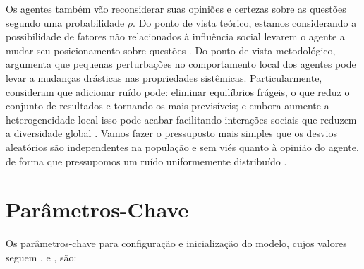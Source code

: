 Os agentes também vão reconsiderar suas opiniões e certezas sobre as questões
segundo uma probabilidade \(\rho\). Do ponto de vista teórico, estamos considerando
a possibilidade de fatores não relacionados à influência social levarem o agente
a mudar seu posicionamento sobre questões \cite{flache2017, lorenz2017modeling}.
Do ponto de vista metodológico,  argumenta que
pequenas perturbações no comportamento local dos agentes pode levar a mudanças
drásticas nas propriedades sistêmicas. Particularmente, consideram que adicionar
ruído pode: eliminar equilíbrios frágeis, o que reduz o conjunto de resultados e
tornando-os mais previsíveis; e embora aumente a heterogeneidade local isso pode
acabar facilitando interações sociais que reduzem a diversidade global
\cite[p.323]{macy2015signal}. Vamos fazer o pressuposto mais simples que os
desvios aleatórios são independentes na população e sem viés quanto à opinião do
agente, de forma que pressupomos um ruído uniformemente distribuído
\cite{Pineda-2009, lorenz2017modeling}.


\section{Parâmetros-Chave}

Os parâmetros-chave para configuração e inicialização do modelo, cujos valores
seguem ,  e
, são:

